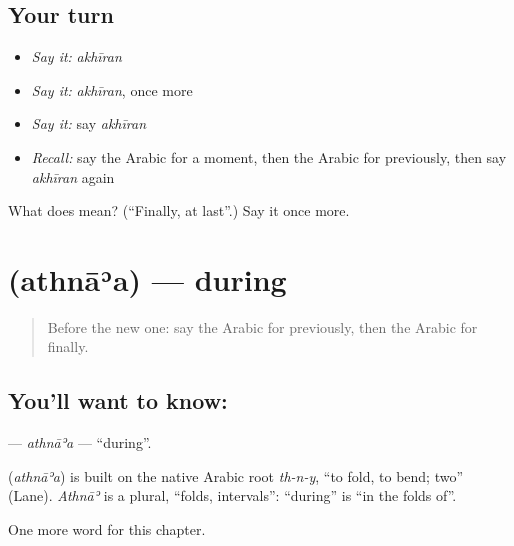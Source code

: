 \subsection*{Your turn}
\begin{itemize}
\raggedright
  \item \emph{Say it:} \emph{akhīran}
  \item \emph{Say it:} \emph{akhīran}, once more
  \item \emph{Say it:} say \emph{akhīran}
  \item \emph{Recall:} say the Arabic for a moment, then the Arabic for previously, then say \emph{akhīran} again
\end{itemize}

\begin{tcolorbox}[breakable,colback=teal!4,colframe=teal!35!black,title={Before you move on}]
What does  mean? (\textquotedblleft{}Finally, at last\textquotedblright{}.) Say it once more.
\end{tcolorbox}
\section[\texorpdfstring{\ar{أثناء} (athnāʾa)}{أثناء (athnāʾa)}]{ (athnāʾa) — during}

\label{lesson:AR-C203-athnaa}



\begin{quote}
Before the new one: say the Arabic for previously, then the Arabic for finally.
\end{quote}

\subsection*{You'll want to know: }
\textbf{} — \emph{athnāʾa} — \textquotedblleft{}during\textquotedblright{}.

\begin{cousinweb}
\textbf{} (\emph{athnāʾa}) is built on the native Arabic root \emph{th-n-y}, \textquotedblleft{}to fold, to bend; two\textquotedblright{} (Lane). \emph{Athnāʾ} is a plural, \textquotedblleft{}folds, intervals\textquotedblright{}: \textquotedblleft{}during\textquotedblright{} is \textquotedblleft{}in the folds of\textquotedblright{}.
\end{cousinweb}

\begin{grammarlens}[title={What you've built}]
One more word for this chapter.
\end{grammarlens}

